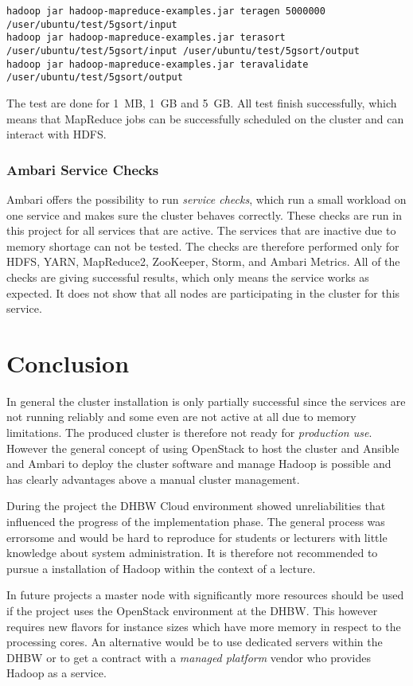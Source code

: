 \lstset{language=sh}
\begin{lstlisting}[caption={Running Terasort as a test for YARN and HDFS}, label={lst:terasort}]
hadoop jar hadoop-mapreduce-examples.jar teragen 5000000 /user/ubuntu/test/5gsort/input
hadoop jar hadoop-mapreduce-examples.jar terasort /user/ubuntu/test/5gsort/input /user/ubuntu/test/5gsort/output
hadoop jar hadoop-mapreduce-examples.jar teravalidate /user/ubuntu/test/5gsort/output
\end{lstlisting}

The test are done for 1~\ac{MB}, 1~\ac{GB} and 5~\ac{GB}.
All test finish successfully, which means that MapReduce jobs can be successfully scheduled on the cluster and can interact with \ac{HDFS}.

\subsubsection{Ambari Service Checks}

Ambari offers the possibility to run \emph{service checks}, which run a small workload on one service and makes sure the cluster behaves correctly.
These checks are run in this project for all services that are active.
The services that are inactive due to memory shortage can not be tested.
The checks are therefore performed  only for \ac{HDFS}, \ac{YARN}, MapReduce2, ZooKeeper, Storm, and Ambari Metrics. All of the checks are giving successful results, which only means the service works as expected. It does not show that all nodes are participating in the cluster for this service. 

\section{Conclusion}

In general the cluster installation is only partially successful since the services are not running reliably and some even are not active at all due to memory limitations.
The produced cluster is therefore not ready for \emph{production use}.
However the general concept of using OpenStack to host the cluster and Ansible and Ambari to deploy the cluster software and manage Hadoop is possible and has clearly advantages above a manual cluster management.

During the project the \ac{DHBW} Cloud environment showed unreliabilities that influenced the progress of the implementation phase.
The general process was errorsome and would be hard to reproduce for students or lecturers with little knowledge about system administration. It is therefore not recommended to pursue a installation of Hadoop within the context of a lecture. 

In future projects a master node with significantly more resources should be used 
if the project uses the OpenStack environment at the \ac{DHBW}.
This however requires new flavors for instance sizes which have more memory in respect to the processing cores.
An alternative would be to use dedicated servers within the \ac{DHBW} or to 
get a contract with a \emph{managed platform} vendor who provides Hadoop as a service.

